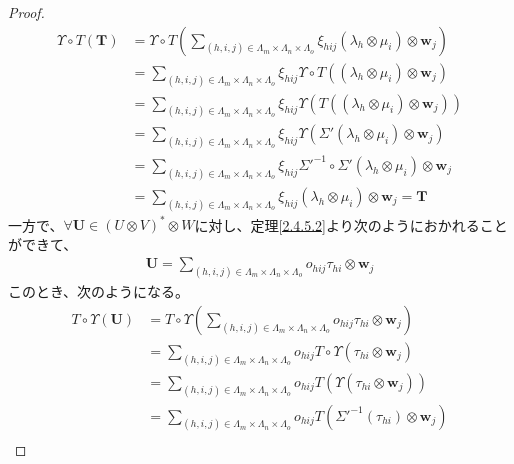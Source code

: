 \documentclass[dvipdfmx]{jsarticle}
\begin{document}
\begin{proof}
\begin{align*}
\varUpsilon \circ T\left( \mathbf{T} \right) &= \varUpsilon \circ T\left( \sum_{(h,i,j) \in \varLambda_{m} \times \varLambda_{n} \times \varLambda_{o}} {\xi_{hij}\left( \lambda_{h} \otimes \mu_{i} \right) \otimes \mathbf{w}_{j}} \right)\\
&= \sum_{(h,i,j) \in \varLambda_{m} \times \varLambda_{n} \times \varLambda_{o}} {\xi_{hij}\varUpsilon \circ T\left( \left( \lambda_{h} \otimes \mu_{i} \right) \otimes \mathbf{w}_{j} \right)}\\
&= \sum_{(h,i,j) \in \varLambda_{m} \times \varLambda_{n} \times \varLambda_{o}} {\xi_{hij}\varUpsilon\left( T\left( \left( \lambda_{h} \otimes \mu_{i} \right) \otimes \mathbf{w}_{j} \right) \right)}\\
&= \sum_{(h,i,j) \in \varLambda_{m} \times \varLambda_{n} \times \varLambda_{o}} {\xi_{hij}\varUpsilon\left( \varSigma'\left( \lambda_{h} \otimes \mu_{i} \right) \otimes \mathbf{w}_{j} \right)}\\
&= \sum_{(h,i,j) \in \varLambda_{m} \times \varLambda_{n} \times \varLambda_{o}} {\xi_{hij}{\varSigma'}^{- 1} \circ \varSigma'\left( \lambda_{h} \otimes \mu_{i} \right) \otimes \mathbf{w}_{j}}\\
&= \sum_{(h,i,j) \in \varLambda_{m} \times \varLambda_{n} \times \varLambda_{o}} {\xi_{hij}\left( \lambda_{h} \otimes \mu_{i} \right) \otimes \mathbf{w}_{j}} = \mathbf{T}
\end{align*}
一方で、$\forall\mathbf{U} \in (U \otimes V)^{*} \otimes W$に対し、定理\ref{2.4.5.2}より次のようにおかれることができて、
\begin{align*}
\mathbf{U} = \sum_{(h,i,j) \in \varLambda_{m} \times \varLambda_{n} \times \varLambda_{o}} {o_{hij}\tau_{hi} \otimes \mathbf{w}_{j}}
\end{align*}
このとき、次のようになる。
\begin{align*}
T \circ \varUpsilon\left( \mathbf{U} \right) &= T \circ \varUpsilon\left( \sum_{(h,i,j) \in \varLambda_{m} \times \varLambda_{n} \times \varLambda_{o}} {o_{hij}\tau_{hi} \otimes \mathbf{w}_{j}} \right)\\
&= \sum_{(h,i,j) \in \varLambda_{m} \times \varLambda_{n} \times \varLambda_{o}} {o_{hij}T \circ \varUpsilon\left( \tau_{hi} \otimes \mathbf{w}_{j} \right)}\\
&= \sum_{(h,i,j) \in \varLambda_{m} \times \varLambda_{n} \times \varLambda_{o}} {o_{hij}T\left( \varUpsilon\left( \tau_{hi} \otimes \mathbf{w}_{j} \right) \right)}\\
&= \sum_{(h,i,j) \in \varLambda_{m} \times \varLambda_{n} \times \varLambda_{o}} {o_{hij}T\left( {\varSigma'}^{- 1}\left( \tau_{hi} \right) \otimes \mathbf{w}_{j} \right)}\\

\end{align*}
\end{proof}
\end{document}

